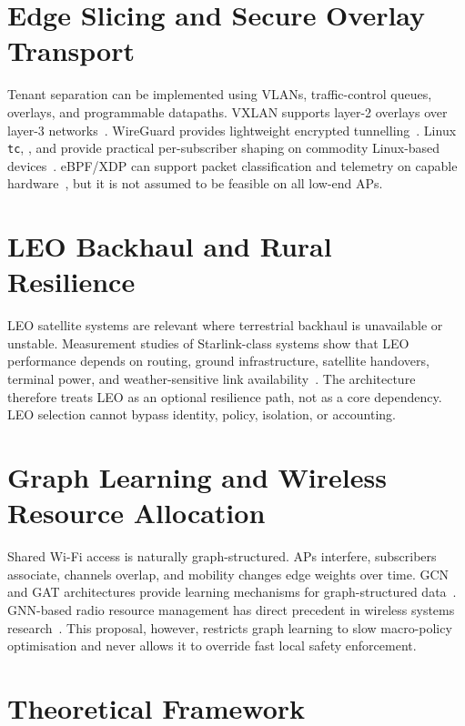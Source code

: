 \section{Edge Slicing and Secure Overlay Transport}
\label{sec:lit-slicing}

Tenant separation can be implemented using VLANs, traffic-control queues, overlays, and programmable datapaths. VXLAN supports layer-2 overlays over layer-3 networks~\cite{rfc7348}. WireGuard provides lightweight encrypted tunnelling~\cite{wireguard2017}. Linux \texttt{tc}, \htb{}, and \fqcodel{} provide practical per-subscriber shaping on commodity Linux-based devices~\cite{openwrt2024}. eBPF/XDP can support packet classification and telemetry on capable hardware~\cite{hoiland2018xdp}, but it is not assumed to be feasible on all low-end APs.

\section{LEO Backhaul and Rural Resilience}
\label{sec:lit-leo}

LEO satellite systems are relevant where terrestrial backhaul is unavailable or unstable. Measurement studies of Starlink-class systems show that LEO performance depends on routing, ground infrastructure, satellite handovers, terminal power, and weather-sensitive link availability~\cite{mohan2023starlink,ullah2025starlink,wu2024handover}. The architecture therefore treats LEO as an optional resilience path, not as a core dependency. LEO selection cannot bypass identity, policy, isolation, or accounting.

\section{Graph Learning and Wireless Resource Allocation}
\label{sec:lit-gnn}

Shared Wi-Fi access is naturally graph-structured. APs interfere, subscribers associate, channels overlap, and mobility changes edge weights over time. GCN and GAT architectures provide learning mechanisms for graph-structured data~\cite{kipf2017gcn,velickovic2018gat}. GNN-based radio resource management has direct precedent in wireless systems research~\cite{shen2021gnn}. This proposal, however, restricts graph learning to slow macro-policy optimisation and never allows it to override fast local safety enforcement.

\section{Theoretical Framework}
\label{sec:theory}

